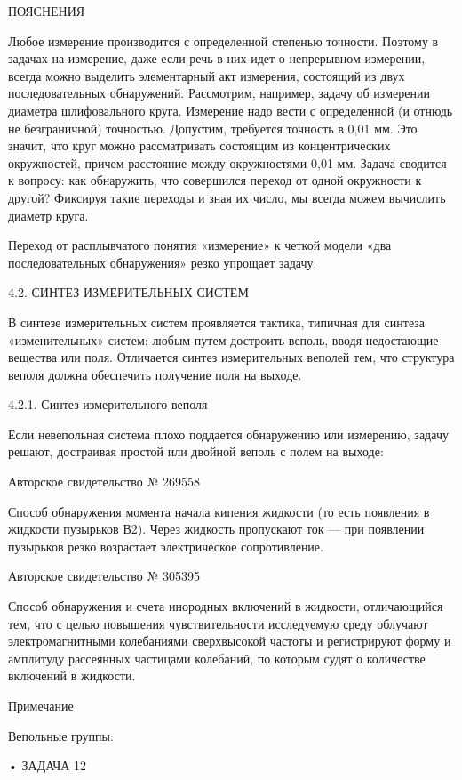 ПОЯСНЕНИЯ

Любое измерение производится с определенной степенью точности. Поэтому
в  задачах на  измерение,  даже если  речь в  них  идет о  непрерывном
измерении, всегда можно выделить элементарный акт измерения, состоящий
из  двух последовательных  обнаружений.  Рассмотрим, например,  задачу
об  измерении диаметра  шлифовального  круга. Измерение  надо вести  с
определенной (и отнюдь не безграничной) точностью. Допустим, требуется
точность в 0,01 мм. Это значит, что круг можно рассматривать состоящим
из концентрических  окружностей, причем расстояние  между окружностями
0,01 мм.  Задача сводится  к вопросу:  как обнаружить,  что совершился
переход от одной  окружности к другой? Фиксируя такие  переходы и зная
их число, мы всегда можем вычислить диаметр круга.

Переход  от расплывчатого  понятия  «измерение» к  четкой модели  «два
последовательных обнаружения» резко упрощает задачу.


4.2. СИНТЕЗ ИЗМЕРИТЕЛЬНЫХ СИСТЕМ

В  синтезе  измерительных  систем проявляется  тактика,  типичная  для
синтеза «изменительных»  систем: любым  путем достроить  веполь, вводя
недостающие вещества или поля. Отличается синтез измерительных веполей
тем, что структура веполя должна обеспечить получение поля на выходе.


4.2.1. Синтез измерительного веполя

Если невепольная  система плохо  поддается обнаружению  или измерению,
задачу  решают,  достраивая простой  или  двойной  веполь с  полем  на
выходе:


Авторское свидетельство № 269558

Способ обнаружения момента начала  кипения жидкости (то есть появления
в  жидкости  пузырьков  В2).  Через  жидкость  пропускают  ток  —  при
появлении пузырьков резко возрастает электрическое сопротивление.


Авторское свидетельство № 305395

Способ   обнаружения  и   счета   инородных   включений  в   жидкости,
отличающийся тем,  что с целью повышения  чувствительности исследуемую
среду  облучают электромагнитными  колебаниями сверхвысокой  частоты и
регистрируют  форму и  амплитуду  рассеянных  частицами колебаний,  по
которым судят о количестве включений в жидкости.

Примечание

Вепольные группы:


• ЗАДАЧА 12


